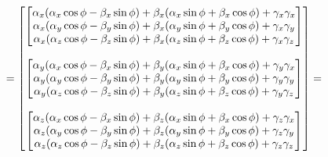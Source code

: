 \[
    =
    \begin{bmatrix}
        \begin{bmatrix}
            \alpha_x (\alpha_x \cos \phi - \beta_x \sin \phi) + \beta_x (\alpha_x \sin \phi + \beta_x \cos \phi) + \gamma_x \gamma_x \\
            \alpha_x (\alpha_y \cos \phi - \beta_y \sin \phi) + \beta_x (\alpha_y \sin \phi + \beta_y \cos \phi) + \gamma_x \gamma_y \\
            \alpha_x (\alpha_z \cos \phi - \beta_z \sin \phi) + \beta_x (\alpha_z \sin \phi + \beta_z \cos \phi) + \gamma_x \gamma_z \\
        \end{bmatrix} \\ \\
        \begin{bmatrix}
            \alpha_y (\alpha_x \cos \phi - \beta_x \sin \phi) + \beta_y (\alpha_x \sin \phi + \beta_x \cos \phi) + \gamma_y \gamma_x \\
            \alpha_y (\alpha_y \cos \phi - \beta_y \sin \phi) + \beta_y (\alpha_y \sin \phi + \beta_y \cos \phi) + \gamma_y \gamma_y \\
            \alpha_y (\alpha_z \cos \phi - \beta_z \sin \phi) + \beta_y (\alpha_z \sin \phi + \beta_z \cos \phi) + \gamma_y \gamma_z \\
        \end{bmatrix} \\ \\
        \begin{bmatrix}
            \alpha_z (\alpha_x \cos \phi - \beta_x \sin \phi) + \beta_z (\alpha_x \sin \phi + \beta_x \cos \phi) + \gamma_z \gamma_x \\
            \alpha_z (\alpha_y \cos \phi - \beta_y \sin \phi) + \beta_z (\alpha_y \sin \phi + \beta_y \cos \phi) + \gamma_z \gamma_y \\
            \alpha_z (\alpha_z \cos \phi - \beta_z \sin \phi) + \beta_z (\alpha_z \sin \phi + \beta_z \cos \phi) + \gamma_z \gamma_z \\
        \end{bmatrix} \\
    \end{bmatrix} =
\]
